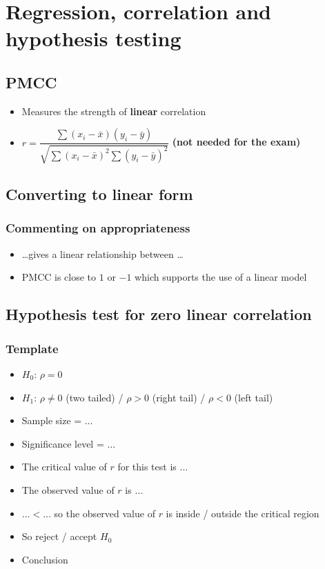 \chapter{Regression, correlation and hypothesis testing}

\section{PMCC}
\begin{itemize}
	\item Measures the strength of \textbf{linear} correlation
	\item $r =\dfrac{\sum\left(x_{i}-\bar{x}\right)\left(y_{i}-\bar{y}\right)}{\sqrt{\sum\left(x_{i}-\bar{x}\right)^{2} \sum\left(y_{i}-\bar{y}\right)^{2}}}$ \textbf{(not needed for the exam)}
\end{itemize}

\section{Converting to linear form}
\subsection{Commenting on appropriateness}
\begin{itemize}
	\item \dots gives a linear relationship between \dots
	\item PMCC is close to $1$ or $-1$ which supports the use of a linear model
\end{itemize}

\section{Hypothesis test for zero linear correlation}
\subsection{Template}
\begin{itemize}
	\item $H_0$: $\rho = 0$
	\item $H_1$: $\rho \neq 0$ (two tailed) / $\rho > 0$ (right tail) / $\rho < 0$ (left tail)
	\item Sample size = $\dots$
	\item Significance level = $\dots$
	\item The critical value of $r$ for this test is $\dots$
	\item The observed value of $r$ is $\dots$
	\item $\dots < \dots$ so the observed value of $r$ is inside / outside the critical region
	\item So reject / accept $H_0$
	\item Conclusion
\end{itemize}




